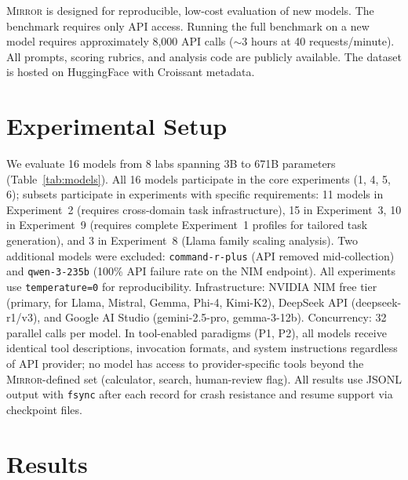 \documentclass[10pt]{article}
\newcommand{\mirror}{\textsc{Mirror}}
\begin{document}
\mirror{} is designed for reproducible, low-cost evaluation of new models. The
benchmark requires only API access.
Running the full benchmark on a new model requires approximately 8,000 API calls
($\sim$3 hours at 40 requests/minute). All prompts, scoring rubrics, and analysis
code are publicly available. The dataset is hosted on HuggingFace with Croissant
metadata.

\section{Experimental Setup}
\label{sec:setup}



We evaluate 16 models from 8 labs spanning 3B to 671B parameters
(Table~\ref{tab:models}). All 16 models participate in the core experiments (1, 4, 5, 6); subsets participate in experiments with specific requirements: 11 models in Experiment~2 (requires cross-domain task infrastructure), 15 in Experiment~3, 10 in Experiment~9 (requires complete Experiment~1 profiles for tailored task generation), and 3 in Experiment~8 (Llama family scaling analysis). Two additional models were excluded:
\texttt{command-r-plus} (API removed mid-collection) and \texttt{qwen-3-235b}
(100\% API failure rate on the NIM endpoint). All experiments use
\texttt{temperature=0} for reproducibility. Infrastructure: NVIDIA NIM free tier
(primary, for Llama, Mistral, Gemma, Phi-4, Kimi-K2), DeepSeek API
(deepseek-r1/v3), and Google AI Studio (gemini-2.5-pro, gemma-3-12b).
Concurrency: 32 parallel calls per model.
In tool-enabled paradigms (P1, P2), all models receive identical tool descriptions,
invocation formats, and system instructions regardless of API provider; no model
has access to provider-specific tools beyond the \mirror{}-defined set
(calculator, search, human-review flag). All results use JSONL output with
\texttt{fsync} after each record for crash resistance and resume support via
checkpoint files.

\section{Results}
\label{sec:results}
\end{document}
